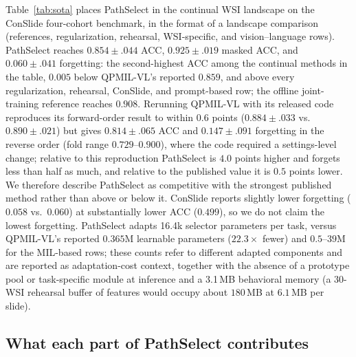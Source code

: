 \documentclass{article}
\begin{document}
Table~\ref{tab:sota} places PathSelect in the continual WSI landscape on the ConSlide four-cohort benchmark, in the format of a landscape comparison (references, regularization, rehearsal, WSI-specific, and vision--language rows). PathSelect reaches $0.854{\pm}.044$ ACC, $0.925{\pm}.019$ masked ACC, and $0.060{\pm}.041$ forgetting: the second-highest ACC among the continual methods in the table, $0.005$ below QPMIL-VL's reported $0.859$, and above every regularization, rehearsal, ConSlide, and prompt-based row; the offline joint-training reference reaches $0.908$. Rerunning QPMIL-VL with its released code reproduces its forward-order result to within $0.6$ points ($0.884{\pm}.033$ vs.\ $0.890{\pm}.021$) but gives $0.814{\pm}.065$ ACC and $0.147{\pm}.091$ forgetting in the reverse order (fold range $0.729$--$0.900$), where the code required a settings-level change; relative to this reproduction PathSelect is $4.0$ points higher and forgets less than half as much, and relative to the published value it is $0.5$ points lower. We therefore describe PathSelect as competitive with the strongest published method rather than above or below it. ConSlide reports slightly lower forgetting ($0.058$ vs.\ $0.060$) at substantially lower ACC ($0.499$), so we do not claim the lowest forgetting. PathSelect adapts 16.4k selector parameters per task, versus QPMIL-VL's reported $0.365$M learnable parameters ($22.3\times$ fewer) and $0.5$--$39$M for the MIL-based rows; these counts refer to different adapted components and are reported as adaptation-cost context, together with the absence of a prototype pool or task-specific module at inference and a 3.1\,MB behavioral memory (a 30-WSI rehearsal buffer of features would occupy about $180$\,MB at $6.1$\,MB per slide).

\subsection{What each part of PathSelect contributes}
\label{ssec:ablation}
\end{document}
